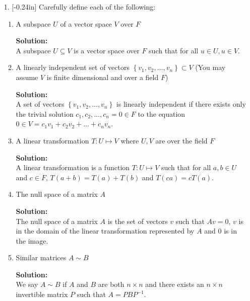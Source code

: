 \documentclass[letterpaper,12pt]{article}
\newcommand{\set}[1]{\left\{ #1 \right\}}
\theoremstyle{definition}
\begin{document}
\begin{enumerate}
    \item[1.] \reversemarginpar{}[-0.24in] Carefully define each of the following: \begin{enumerate}
        \item A subspace $U$ of a vector space $V$ over $F$
        \begin{mdframed}
        \textbf{Solution:} \\
A subspace $U\subseteq V$ is a vector space over $F$ such that for all $u \in U, u \in V$.
\end{mdframed}
\vspace{0.3in}
        \item A linearly independent set of vectors $\set{v_1,v_2,\ldots,v_n} \subset V$ (You may assume $V$ is finite dimensional and over a field $F$)
        \begin{mdframed}
            \textbf{Solution:} \\
A set of vectors $\set{v_1,v_2,\ldots,v_n}$ is linearly independent if there exists only the trivial solution $c_1,c_2,\ldots,c_n=0 \in F$ to the equation $0 \in V =c_1v_1 + c_2v_2 + \ldots + c_nv_n$.
        \end{mdframed}
        \item A linear transformation $T: U \mapsto V$ where $U,V$ are over the field $F$
         \begin{mdframed}
            \textbf{Solution:} \\
A linear transformation is a function $T:U \mapsto V$ such that for all $a,b \in U$ and $c \in F$, $T(a+b) = T(a) + T(b)$ and $T(ca) = cT(a)$.
\end{mdframed}
\vspace{0.2in}
         \item The null space of a matrix $A$
          \begin{mdframed}
            \textbf{Solution:} \\
The null space of a matrix $A$ is the set of vectors $v$ such that $Av = 0$, $v$ is in the domain of the linear transformation represented by $A$ and $0$ is in the image.
\end{mdframed}
         \item Similar matrices $A \sim B$
         \begin{mdframed}
         \textbf{Solution:} \\
             We say $A \sim B$ if $A$ and $B$ are both $n\times n$ and there exists an $n\times n$ invertible matrix $P$ such that $A = PBP^{-1}$.

\end{mdframed}
\end{enumerate}
\end{enumerate}
\end{document}
